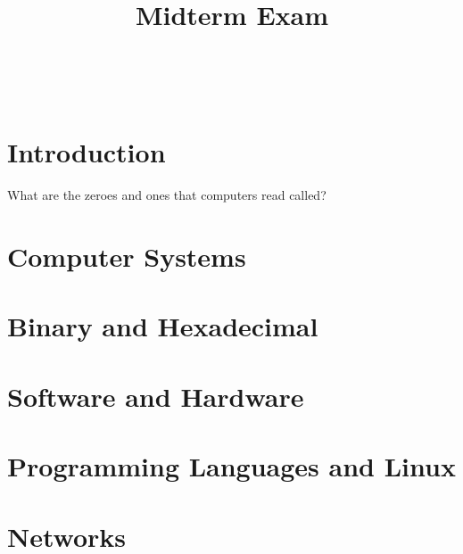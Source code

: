 \documentclass[answers,addpoints]{exam}
\title{
    \vspace{-1cm}
	\horrule{1pt}\\[.5em]
	\huge Midterm Exam
	\horrule{2pt}
	\vspace{-1cm}
}
\author{}
\date{}
\begin{document}
\maketitle
    
\begin{center}
\end{center}

\vspace{0.2in}
 \\[2em]

\vspace{1in}
\begin{center}
    \gradetable[h][questions]
\end{center}

\pagebreak

\section{Introduction}

\begin{questions}
    \question[5] What are the zeroes and ones that computers read called?
    \answerline[Bits]
\end{questions}

\section{Computer Systems}

\section{Binary and Hexadecimal}

\section{Software and Hardware}

\section{Programming Languages and Linux}

\section{Networks}
\end{document}
